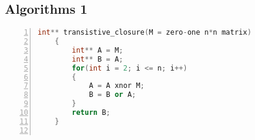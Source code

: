\documentclass{report}
\begin{document}
\subsection*{Algorithms 1}
\begin{lstlisting}[language=C++, numbers=left,
                numberstyle=\tiny,keywordstyle=\color{blue!70},
                commentstyle=\color{red!50!green!50!blue!50},frame=shadowbox,
                rulesepcolor=\color{red!20!green!20!blue!20},basicstyle=\ttfamily]
    int** transistive_closure(M = zero-one n*n matrix)
    {
        int** A = M;
        int** B = A;
        for(int i = 2; i <= n; i++)
        {
            A = A xnor M;
            B = B or A;
        }
        return B;
    }
    
\end{lstlisting}
\end{document}
